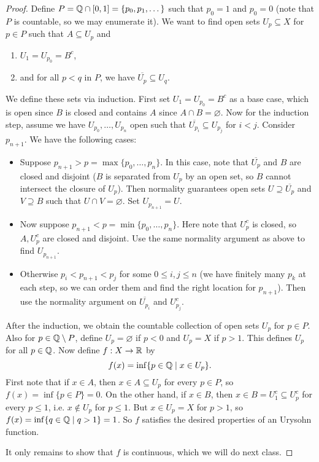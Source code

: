 \begin{proof}
  Define $P = \mathbb{Q} \cap [0, 1] = \{p_0, p_1, \dots\}$
  such that $p_0 = 1$ and $p_0 = 0$ (note that
  $P$ is countable, so we may enumerate it).
  We want to find open sets $U_p \subseteq X$
  for $p \in P$ such that $A \subseteq U_p$ and
  \begin{enumerate}
    \item $U_1 = U_{p_0} = B^c$,
    \item and for all $p < q$ in $P$, we have
      $\overline{U_p} \subseteq U_q$.
  \end{enumerate}
  We define these sets via induction. First
  set $U_1 = U_{p_0} = B^c$ as a base case, which
  is open since $B$ is closed and contains $A$
  since $A \cap B = \varnothing$. Now
  for the induction step, assume we have
  $U_{p_0}, \dots, U_{p_n}$ open such that
  $\overline{U_{p_i}} \subseteq U_{p_j}$
  for $i < j$. Consider $p_{n + 1}$. We have
  the following cases:
  \begin{itemize}
    \item Suppose $p_{n + 1} > p = \max\{p_0, \dots, p_n\}$.
      In this case, note that
      $\overline{U_p}$ and $B$ are closed and disjoint
      ($B$ is separated from $U_p$ by an open set,
      so $B$ cannot intersect the closure of $U_p$).
      Then normality guarantees open sets
      $U \supseteq \overline{U_p}$ and
      $V \supseteq B$ such that $U \cap V = \varnothing$.
      Set $U_{p_{n + 1}} = U$.
    \item Now suppose $p_{n + 1} < p = \min\{p_0, \dots, p_n\}$.
      Here note that $U_p^c$ is closed, so
      $A, U_p^c$ are closed and disjoint. Use the
      same normality argument as above to find
      $U_{p_{n + 1}}$.
    \item Otherwise $p_i < p_{n + 1} < p_j$
      for some $0 \le i, j \le n$ (we have finitely
      many $p_k$ at each step, so we can order them
      and find the right location for $p_{n + 1}$).
      Then use the normality argument on
      $\overline{U_{p_i}}$ and $U_{p_j}^c$.
  \end{itemize}
  After the induction, we obtain the countable
  collection of open sets $U_p$ for $p \in P$.
  Also for $p \in \mathbb{Q} \setminus P$, define
  $U_p = \varnothing$
  if $p < 0$ and $U_p = X$ if $p > 1$. This
  defines $U_p$ for all $p \in \mathbb{Q}$. Now define
  $f : X \to \mathbb{R}$ by
  \[
    f(x) = \inf\{p \in \mathbb{Q} \mid x \in U_p\}.
  \]
  First note that if $x \in A$, then
  $x \in A \subseteq U_p$ for every $p \in P$,
  so $f(x) = \inf\{p \in P\} = 0$.
  On the other hand, if $x \in B$, then
  $x \in B = U_1^c \subseteq U_p^c$ for every
  $p \le 1$, i.e. $x \notin U_p$ for $p \le 1$.
  But $x \in U_p = X$ for $p > 1$, so
  $f(x) = \inf\{q \in \mathbb{Q} \mid q > 1\} = 1$.
  So $f$ satisfies the desired properties of an
  Urysohn function.

  It only remains to show that $f$ is continuous,
  which we will do next class.
\end{proof}
